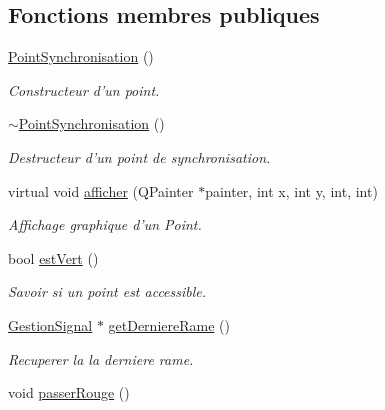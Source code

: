 \subsection*{Fonctions membres publiques}
\begin{DoxyCompactItemize}
\item 
\hypertarget{classPointSynchronisation_ab0be3460c6b050a8a9a0ff98fc596cb2}{
\hyperlink{classPointSynchronisation_ab0be3460c6b050a8a9a0ff98fc596cb2}{PointSynchronisation} ()}
\label{classPointSynchronisation_ab0be3460c6b050a8a9a0ff98fc596cb2}

\begin{DoxyCompactList}\small\item\em Constructeur d'un point. \item\end{DoxyCompactList}\item 
\hypertarget{classPointSynchronisation_a9ad32b2006c258e3b9b493ae9b67cb49}{
\hyperlink{classPointSynchronisation_a9ad32b2006c258e3b9b493ae9b67cb49}{$\sim$PointSynchronisation} ()}
\label{classPointSynchronisation_a9ad32b2006c258e3b9b493ae9b67cb49}

\begin{DoxyCompactList}\small\item\em Destructeur d'un point de synchronisation. \item\end{DoxyCompactList}\item 
virtual void \hyperlink{classPointSynchronisation_a53db6636fdb405bb30fab20b7dc4d374}{afficher} (QPainter $\ast$painter, int x, int y, int, int)
\begin{DoxyCompactList}\small\item\em Affichage graphique d'un Point. \item\end{DoxyCompactList}\item 
bool \hyperlink{classPointSynchronisation_a230f8d22845e44ea7cd4cb96d9f5128c}{estVert} ()
\begin{DoxyCompactList}\small\item\em Savoir si un point est accessible. \item\end{DoxyCompactList}\item 
\hyperlink{classGestionSignal}{GestionSignal} $\ast$ \hyperlink{classPointSynchronisation_a6cecce4b7274aabe549c96b2d55b0cda}{getDerniereRame} ()
\begin{DoxyCompactList}\small\item\em Recuperer la la derniere rame. \item\end{DoxyCompactList}\item 
\hypertarget{classPointSynchronisation_ac66ba2db21a7120b143b85301680e439}{
void \hyperlink{classPointSynchronisation_ac66ba2db21a7120b143b85301680e439}{passerRouge} ()}
\label{classPointSynchronisation_ac66ba2db21a7120b143b85301680e439}


\end{DoxyCompactItemize}
